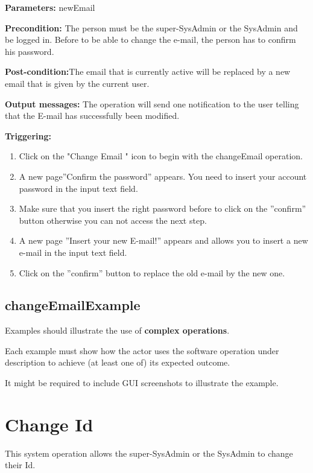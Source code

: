 \begin{description}

\item \textbf{Parameters:} newEmail
\item \textbf{Precondition:} The person must be the super-SysAdmin or the
SysAdmin and be logged in. Before to be able to change the e-mail, the person
has to confirm his password.
\item \textbf{Post-condition:}The email that is currently active will be
replaced by a new email that is given by the current user.
\item \textbf{Output messages:} The operation will send one notification to the
user telling that the E-mail has successfully been modified.


\item \textbf{Triggering:}
\begin{enumerate}
\item Click on the "Change Email " icon to begin with the changeEmail operation. 
\item A new page''Confirm the password'' appears. You need to insert your
account password in the input text field. 
\item Make sure that you insert the right password before to click on the
''confirm'' button otherwise you can not access the next step.
\item A new page ''Insert your new E-mail!'' appears and allows you to
insert a new e-mail in the input text field.
\item Click on the ''confirm'' button to replace the old e-mail by the new one.

\end{enumerate}

 
\end{description}

 
\subsection{changeEmailExample}
Examples should illustrate the use of \textbf{complex operations}.

Each example must show how the actor uses the software operation under
description to achieve (at least one of) its expected outcome.

It might be required to include GUI screenshots to illustrate the example.




\section{Change Id}
\label{operation:changeId}
This system operation allows the super-SysAdmin or the SysAdmin to change
their Id.

